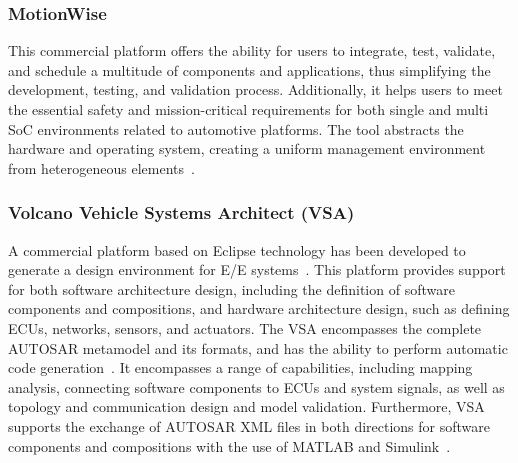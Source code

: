 \subsubsection{MotionWise} 
This commercial platform offers the ability for users to integrate, test, validate, and schedule a multitude of components and applications, thus simplifying the development, testing, and validation process. Additionally, it helps users to meet the essential safety and mission-critical requirements for both single and multi SoC environments related to automotive platforms. The tool abstracts the hardware and operating system, creating a uniform management environment from heterogeneous elements~\cite{motionwise, askaripoor2022architecture}.







\subsubsection{Volcano Vehicle Systems Architect (VSA)} 
A commercial platform based on Eclipse technology has been developed to generate a design environment for E/E systems~\cite{eclipse,VSA}. This platform provides support for both software architecture design, including the definition of software components and compositions, and hardware architecture design, such as defining ECUs, networks, sensors, and actuators.
The VSA encompasses the complete AUTOSAR metamodel and its formats, and has the ability to perform automatic code generation~\cite{furst2009autosar}. It encompasses a range of capabilities, including mapping analysis, connecting software components to ECUs and system signals, as well as topology and communication design and model validation. Furthermore, VSA supports the exchange of AUTOSAR XML files in both directions for software components and compositions with the use of MATLAB and Simulink~\cite{MATLAB:2010}.





